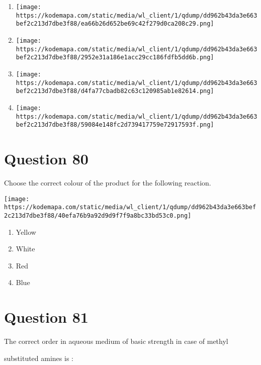 \documentclass{article}
\begin{document}
\begin{enumerate}[label=(\alph*)]
\item \texttt{[image: https://kodemapa.com/static/media/wl\_client/1/qdump/dd962b43da3e663bef2c213d7dbe3f88/ea66b26d652be69c42f279d0ca208c29.png]}


\item \texttt{[image: https://kodemapa.com/static/media/wl\_client/1/qdump/dd962b43da3e663bef2c213d7dbe3f88/2952e31a186e1acc29cc186fdfb5dd6b.png]}


\item \texttt{[image: https://kodemapa.com/static/media/wl\_client/1/qdump/dd962b43da3e663bef2c213d7dbe3f88/d4fa77cbadb82c63c120985ab1e82614.png]}


\item \texttt{[image: https://kodemapa.com/static/media/wl\_client/1/qdump/dd962b43da3e663bef2c213d7dbe3f88/59084e148fc2d739417759e72917593f.png]}


\end{enumerate}
\newpage
\section*{Question 80}
Choose the correct colour of the product for the following reaction.



\texttt{[image: https://kodemapa.com/static/media/wl\_client/1/qdump/dd962b43da3e663bef2c213d7dbe3f88/40efa76b9a92d9d9f7f9a8bc33bd53c0.png]}\\


\begin{enumerate}[label=(\alph*)]
\item Yellow


\item White


\item Red


\item Blue


\end{enumerate}
\newpage
\section*{Question 81}
The correct order in aqueous medium of basic strength in case of methyl

substituted amines is :
\end{document}
